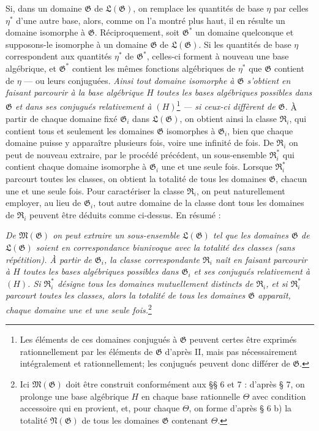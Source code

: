Si, dans un domaine $\mathfrak G$ de $\mathfrak L(\mathfrak G)$, on remplace les quantités de base $\eta$ par celles $\eta^*$ d'une autre base, alors, comme on l'a montré plus haut, il en résulte un domaine isomorphe à $\mathfrak G$. Réciproquement, soit $\mathfrak G^*$ un domaine quelconque et supposons-le isomorphe à un domaine $\mathfrak G$ de $\mathfrak L(\mathfrak G)$. Si les quantités de base $\eta$ correspondent aux quantités $\eta^*$ de $\mathfrak G^*$, celles-ci forment à nouveau une base algébrique, et $\mathfrak G^*$ contient les mêmes fonctions algébriques de $\eta^*$ que $\mathfrak G$ contient de $\eta$ --- ou leurs conjuguées. \emph{Ainsi tout domaine isomorphe à $\mathfrak G$ s'obtient en faisant parcourir à la base algébrique $H$ toutes les bases algébriques possibles dans $\mathfrak G$ et dans ses conjugués relativement à $(H)$}\footnote{Les éléments de ces domaines conjugués à $\mathfrak G$ peuvent certes être exprimés rationnellement par les éléments de $\mathfrak G$ d'après II, mais pas nécessairement intégralement et rationnellement; les conjugués peuvent donc différer de $\mathfrak G$.} \emph{--- si ceux-ci diffèrent de $\mathfrak G$.} À partir de chaque domaine fixé $\mathfrak G_i$ dans $\mathfrak L(\mathfrak G)$, on obtient ainsi la classe $\mathfrak R_i$, qui contient tous et seulement les domaines $\mathfrak G$ isomorphes à $\mathfrak G_i$, bien que chaque domaine puisse y apparaître plusieurs fois, voire une infinité de fois. De $\mathfrak R_i$ on peut de nouveau extraire, par le procédé précédent, un sous-ensemble $\mathfrak R_i^*$ qui contient chaque domaine isomorphe à $\mathfrak G_i$ une et une seule fois. Lorsque $\mathfrak R_i^*$ parcourt toutes les classes, on obtient la totalité de tous les domaines $\mathfrak G$, chacun une et une seule fois. Pour caractériser la classe $\mathfrak R_i$, on peut naturellement employer, au lieu de $\mathfrak G_i$, tout autre domaine de la classe dont tous les domaines de $\mathfrak R_i$ peuvent être déduits comme ci-dessus. En résumé :

\emph{De $\mathfrak M(\mathfrak G)$ on peut extraire un sous-ensemble $\mathfrak L(\mathfrak G)$ tel que les domaines $\mathfrak G$ de $\mathfrak L(\mathfrak G)$ soient en correspondance biunivoque avec la totalité des classes (sans répétition). À partir de $\mathfrak G_i$, la classe correspondante $\mathfrak R_i$ naît en faisant parcourir à $H$ toutes les bases algébriques possibles dans $\mathfrak G_i$ et ses conjugués relativement à $(H)$. Si $\mathfrak R_i^*$ désigne tous les domaines mutuellement distincts de $\mathfrak R_i$, et si $\mathfrak R_i^*$ parcourt toutes les classes, alors la totalité de tous les domaines $\mathfrak G$ apparaît, chaque domaine une et une seule fois.}\footnote{Ici $\mathfrak M(\mathfrak G)$ doit être construit conformément aux \S{}\S{} 6 et 7 : d'après \S{} 7, on prolonge une base algébrique $H$ en chaque base rationnelle $\Theta$ avec condition accessoire qui en provient, et, pour chaque $\Theta$, on forme d'après \S{} 6 b) la totalité $\mathfrak N(\mathfrak G)$ de tous les domaines $\mathfrak G$ contenant $\Theta$.}


